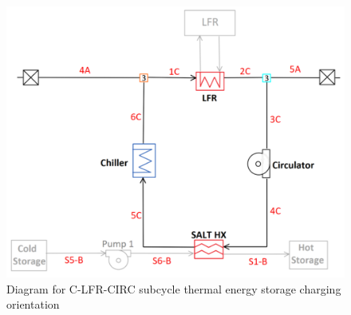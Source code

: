 \begin{figure}[H]
    \widefigure
    \includegraphics[width=10 cm]{Definitions/c-lfr-circ-sub.pdf}
    \caption{Diagram for C-LFR-CIRC subcycle thermal energy storage charging orientation\label{c-lfr-circ-sub}}
\end{figure}

